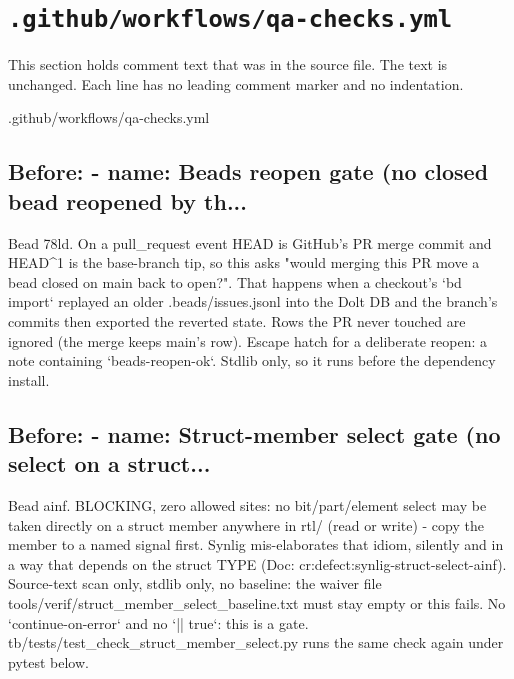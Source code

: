\section{\texttt{.github/workflows/qa-checks.yml}}\label{um:flow:ci-qa-checks}

This section holds comment text that was in the source file. The text is unchanged. Each line has no leading comment marker and no indentation.

\begin{relocated}{.github/workflows/qa-checks.yml}

\subsection*{Before: - name: Beads reopen gate (no closed bead reopened by th...}

\begin{textblock}
Bead 78ld. On a pull_request event HEAD is GitHub's PR merge commit and
HEAD^1 is the base-branch tip, so this asks "would merging this PR move a
bead closed on main back to open?". That happens when a checkout's
`bd import` replayed an older .beads/issues.jsonl into the Dolt DB and the
branch's commits then exported the reverted state. Rows the PR never
touched are ignored (the merge keeps main's row). Escape hatch for a
deliberate reopen: a note containing `beads-reopen-ok`. Stdlib only, so
it runs before the dependency install.
\end{textblock}

\subsection*{Before: - name: Struct-member select gate (no select on a struct...}

\begin{textblock}
Bead ainf. BLOCKING, zero allowed sites: no bit/part/element select may be taken directly on
a struct member anywhere in rtl/ (read or write) - copy the member to a named signal first.
Synlig mis-elaborates that idiom, silently and in a way that depends on the struct TYPE
(Doc: cr:defect:synlig-struct-select-ainf). Source-text scan only, stdlib only, no baseline: the
waiver file tools/verif/struct_member_select_baseline.txt must stay empty or this fails.
No `continue-on-error` and no `|| true`: this is a gate. tb/tests/test_check_struct_member_select.py
runs the same check again under pytest below.
\end{textblock}


\end{relocated}

